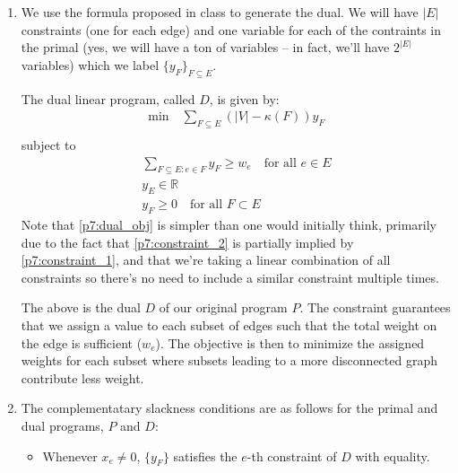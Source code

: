 \documentclass[12pt]{exam}
\newtheorem{lemma}[theorem]{Lemma}
\begin{document}
\begin{questions}
\begin{solution}
\begin{enumerate}[label=(\alph*)]
      \begin{lemma}
        The 1-1 correspondance above is objective function-preserving.
      \end{lemma}
      \begin{proof}
        To see this, note that both proposals above essentially use $x_e$ as an indicator variable for whether or not $e$ is included in our spanning tree. As such, the maximization of $\sum_{e \in E} w_e x_e$ in our linear program $P$ maps directly to weight of the corresponding spanning three $T$.
      \end{proof}
    \item 
      We use the formula proposed in class to generate the dual. We will have $|E|$ constraints (one for each edge) and one variable for each of the contraints in the primal (yes, we will have a ton of variables -- in fact, we'll have $2^{|E|}$ variables) which we label $\{y_F \}_{F \subseteq E}$.

      The dual linear program, called $D$, is given by:
      \begin{align}
          \text{min} \quad \sum_{F \subseteq E} (|V| - \kappa(F))y_F \label{p7:dual_obj} \\
      \end{align}
        subject to
        \begin{align}
          \sum_{F \subseteq E: e \in F} y_F \geq w_e \quad \text{for all } e \in E \label{p7:dual_constraint_1} \\
          y_E \in \mathbb{R} \label{p7:dual_constraint_2} \\
          y_F \geq 0 \quad \text{for all } F \subset E \label{p7:dual_constraint_3}
        \end{align}
        Note that \ref{p7:dual_obj} is simpler than one would initially think, primarily due to the fact that \ref{p7:constraint_2} is partially implied by \ref{p7:constraint_1}, and that we're taking a linear combination of all constraints so there's no need to include a similar constraint multiple times.

        The above is the dual $D$ of our original program $P$. The constraint guarantees that we assign a value to each subset of edges such that the total weight on the edge is sufficient ($w_e$). The objective is then to minimize the assigned weights for each subset where subsets leading to a more disconnected graph contribute less weight.

    \item
      The complementatary slackness conditions are as follows for the primal and dual programs, $P$ and $D$:
        \begin{itemize}
          \item
            Whenever $x_e \neq 0$, $\{y_F\}$ satisfies the $e$-th constraint of $D$ with equality.


\end{itemize}
\end{enumerate}
\end{solution}
\end{questions}
\end{document}
